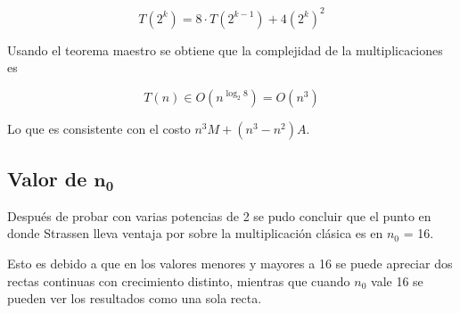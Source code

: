 \documentclass[12pt,letterpaper]{scrartcl}
\begin{document}
$$ T(2^k) = 8\cdot T( 2^{k-1}) + 4(2^k)^2 $$

Usando el teorema maestro se obtiene que la complejidad de la multiplicaciones es

$$T(n) \in O(n^{\log_2 8}) = O ( n^{3} )$$

Lo que es consistente con el costo $n^3M + (n^3 - n^2)A$.

\subsection{Valor de $\mathbf{n_0}$}

Después de probar con varias potencias de 2 se pudo concluir que el punto en donde Strassen lleva ventaja por sobre la multiplicación clásica es en $n_0$ = 16. 

Esto es debido a que en los valores menores y mayores a 16 se puede apreciar dos rectas continuas con crecimiento distinto, mientras que cuando $n_0$ vale 16 se pueden ver los resultados como una sola recta.
\end{document}
